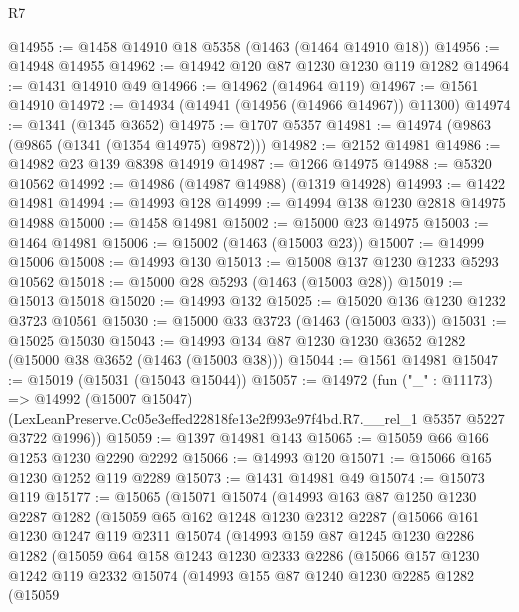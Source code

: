 \begin{lexlean}{R7}
\begin{coremodule}
@14955 := @1458 @14910 @18 @5358 (@1463 (@1464 @14910 @18))
@14956 := @14948 @14955
@14962 := @14942 @120 @87 @1230 @1230 @119 @1282
@14964 := @1431 @14910 @49
@14966 := @14962 (@14964 @119)
@14967 := @1561 @14910
@14972 := @14934 (@14941 (@14956 (@14966 @14967)) @11300)
@14974 := @1341 (@1345 @3652)
@14975 := @1707 @5357
@14981 := @14974 (@9863 (@9865 (@1341 (@1354 @14975) @9872)))
@14982 := @2152 @14981
@14986 := @14982 @23 @139 @8398 @14919
@14987 := @1266 @14975
@14988 := @5320 @10562
@14992 := @14986 (@14987 @14988) (@1319 @14928)
@14993 := @1422 @14981
@14994 := @14993 @128
@14999 := @14994 @138 @1230 @2818 @14975 @14988
@15000 := @1458 @14981
@15002 := @15000 @23 @14975
@15003 := @1464 @14981
@15006 := @15002 (@1463 (@15003 @23))
@15007 := @14999 @15006
@15008 := @14993 @130
@15013 := @15008 @137 @1230 @1233 @5293 @10562
@15018 := @15000 @28 @5293 (@1463 (@15003 @28))
@15019 := @15013 @15018
@15020 := @14993 @132
@15025 := @15020 @136 @1230 @1232 @3723 @10561
@15030 := @15000 @33 @3723 (@1463 (@15003 @33))
@15031 := @15025 @15030
@15043 := @14993 @134 @87 @1230 @1230 @3652 @1282 (@15000 @38 @3652 (@1463 (@15003 @38)))
@15044 := @1561 @14981
@15047 := @15019 (@15031 (@15043 @15044))
@15057 := @14972
    (fun ("_" : @11173) =>
    @14992
      (@15007 @15047)
      (LexLeanPreserve.Cc05e3effed22818fe13e2f993e97f4bd.R7.__rel_1 @5357 @5227 @3722 @1996))
@15059 := @1397 @14981 @143
@15065 := @15059 @66 @166 @1253 @1230 @2290 @2292
@15066 := @14993 @120
@15071 := @15066 @165 @1230 @1252 @119 @2289
@15073 := @1431 @14981 @49
@15074 := @15073 @119
@15177 := @15065
    (@15071
      @15074
      (@14993
        @163
        @87
        @1250
        @1230
        @2287
        @1282
        (@15059
          @65
          @162
          @1248
          @1230
          @2312
          @2287
          (@15066
            @161
            @1230
            @1247
            @119
            @2311
            @15074
            (@14993
              @159
              @87
              @1245
              @1230
              @2286
              @1282
              (@15059
                @64
                @158
                @1243
                @1230
                @2333
                @2286
                (@15066
                  @157
                  @1230
                  @1242
                  @119
                  @2332
                  @15074
                  (@14993
                    @155
                    @87
                    @1240
                    @1230
                    @2285
                    @1282
                    (@15059

\end{coremodule}
\end{lexlean}
